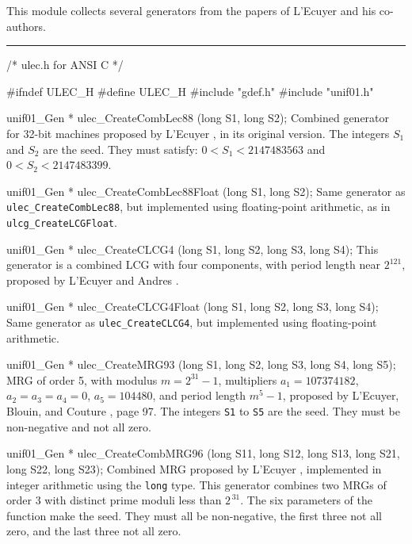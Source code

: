 
This module collects several generators from the papers of
L'Ecuyer and his co-authors.

\bigskip
\hrule
\code
\hide
/*  ulec.h  for ANSI C  */

#ifndef ULEC_H
#define ULEC_H
\endhide
#include "gdef.h"
#include "unif01.h"


unif01_Gen * ulec_CreateCombLec88 (long S1, long S2);
\endcode
 \tab  Combined generator for 32-bit machines proposed by
  L'Ecuyer \cite{rLEC88a}, in its original version.
%
  The integers $S_1$ and $S_2$ are the seed.
  They must satisfy: $0 < S_1 < 2147483563$ and $0 < S_2 < 2147483399$.
 \endtab
\code


unif01_Gen * ulec_CreateCombLec88Float (long S1, long S2);
\endcode
 \tab  Same generator as {\tt ulec\_CreateCombLec88},
  but implemented using floating-point arithmetic, as in
  {\tt ulcg\_CreateLCGFloat}.
 \endtab
\code


unif01_Gen * ulec_CreateCLCG4 (long S1, long S2, long S3, long S4);
\endcode
 \tab  This generator is a combined LCG with four components,
%
  with period length near $2^{121}$,
  proposed by L'Ecuyer and Andres \cite{rLEC97d}.
 \endtab
\code


unif01_Gen * ulec_CreateCLCG4Float (long S1, long S2, long S3, long S4);
\endcode
 \tab  Same generator as {\tt ulec\_CreateCLCG4},
  but implemented using floating-point arithmetic.
 \endtab
\code


unif01_Gen * ulec_CreateMRG93 (long S1, long S2, long S3, long S4, long S5);
\endcode
 \tab  MRG of order 5, with modulus $m=2^{31}-1$, multipliers
   $a_1 = 107374182$, $a_2 = a_3 = a_4 = 0$, $a_5 = 104480$,
   and period length $m^5-1$, proposed by
  L'Ecuyer, Blouin, and Couture \cite{rLEC93a}, page 97.
%
  The integers {\tt S1} to {\tt S5} are the seed.
  They must be non-negative and not all zero.
 \endtab
\code


unif01_Gen * ulec_CreateCombMRG96 (long S11, long S12, long S13,
                                   long S21, long S22, long S23);
\endcode
 \tab  Combined MRG proposed by L'Ecuyer \cite{rLEC96b}, implemented
   in integer arithmetic using the {\tt long} type.
   This generator combines two MRGs of order 3 with distinct prime
%
   moduli less than $2^{\,31}$.
   The six parameters of the function make the seed.
   They must all be non-negative, the first three not all zero,
   and the last three not all zero.
 \endtab
\code


